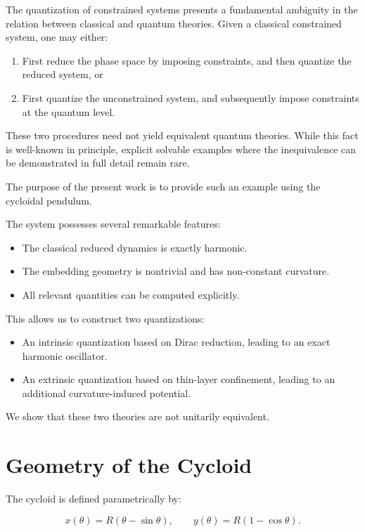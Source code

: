 \documentclass[11pt]{article}
\begin{document}
The quantization of constrained systems presents a fundamental ambiguity in the relation between classical and quantum theories. Given a classical constrained system, one may either:

\begin{enumerate}
\item First reduce the phase space by imposing constraints, and then quantize the reduced system, or
\item First quantize the unconstrained system, and subsequently impose constraints at the quantum level.
\end{enumerate}

These two procedures need not yield equivalent quantum theories. While this fact is well-known in principle, explicit solvable examples where the inequivalence can be demonstrated in full detail remain rare.

The purpose of the present work is to provide such an example using the cycloidal pendulum.

The system possesses several remarkable features:

\begin{itemize}
\item The classical reduced dynamics is exactly harmonic.
\item The embedding geometry is nontrivial and has non-constant curvature.
\item All relevant quantities can be computed explicitly.
\end{itemize}

This allows us to construct two quantizations:

\begin{itemize}
\item An intrinsic quantization based on Dirac reduction, leading to an exact harmonic oscillator.
\item An extrinsic quantization based on thin-layer confinement, leading to an additional curvature-induced potential.
\end{itemize}

We show that these two theories are not unitarily equivalent.

\section{Geometry of the Cycloid}

The cycloid is defined parametrically by:

\begin{equation}
x(\theta) = R(\theta - \sin\theta), \qquad
y(\theta) = R(1 - \cos\theta).
\end{equation}
\end{document}
